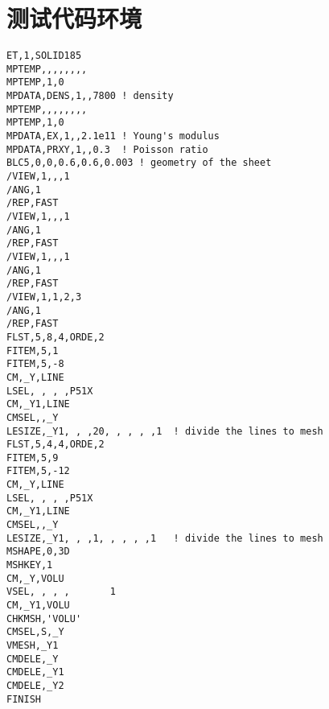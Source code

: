 \chapter{测试代码环境} %
\label{cha:测试代码环境}
	\begin{lstlisting}[language=APDL]
ET,1,SOLID185   
MPTEMP,,,,,,,,  
MPTEMP,1,0  
MPDATA,DENS,1,,7800 ! density
MPTEMP,,,,,,,,  
MPTEMP,1,0  
MPDATA,EX,1,,2.1e11 ! Young's modulus
MPDATA,PRXY,1,,0.3  ! Poisson ratio
BLC5,0,0,0.6,0.6,0.003 ! geometry of the sheet
/VIEW,1,,,1 
/ANG,1  
/REP,FAST   
/VIEW,1,,,1 
/ANG,1  
/REP,FAST   
/VIEW,1,,,1 
/ANG,1  
/REP,FAST   
/VIEW,1,1,2,3   
/ANG,1  
/REP,FAST   
FLST,5,8,4,ORDE,2   
FITEM,5,1   
FITEM,5,-8  
CM,_Y,LINE  
LSEL, , , ,P51X 
CM,_Y1,LINE 
CMSEL,,_Y    
LESIZE,_Y1, , ,20, , , , ,1  ! divide the lines to mesh 
FLST,5,4,4,ORDE,2   
FITEM,5,9   
FITEM,5,-12 
CM,_Y,LINE  
LSEL, , , ,P51X 
CM,_Y1,LINE 
CMSEL,,_Y    
LESIZE,_Y1, , ,1, , , , ,1   ! divide the lines to mesh 
MSHAPE,0,3D 
MSHKEY,1
CM,_Y,VOLU  
VSEL, , , ,       1 
CM,_Y1,VOLU 
CHKMSH,'VOLU'   
CMSEL,S,_Y    
VMESH,_Y1    
CMDELE,_Y   
CMDELE,_Y1  
CMDELE,_Y2  
FINISH
    \end{lstlisting}
